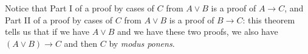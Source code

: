 \documentclass[12pt]{article}
\begin{document}
Notice that Part I of a proof by cases of $C$ from $A \vee B$ is a
proof of $A \rightarrow C$, and Part II of a proof by cases of $C$
from $A \vee B$ is a proof of $B \rightarrow C$: this theorem tells us
that if we have $A\vee B$ and we have these two proofs, we also have
$(A \vee B)\rightarrow C$ and then $C$ by {\em modus ponens\/}.

\newpage

\begin{comment}

\subsubsection{More Examples}

One direction of de Morgan's laws:

\begin{description}

\item [Theorem:]  $$\neg(A \wedge B) \leftrightarrow \neg A \vee \neg B$$

\begin{description}

\item[Part I:]  Goal:  $\neg(A \wedge B) \rightarrow \neg A \vee \neg B$

\begin{description}

\item[Assume (1):]  $\neg(A \wedge B)$

\item[Goal:]  $\neg A \vee \neg B$

Use the strategy for disjunction.

\begin{description}

\item[Assume (2):]  $\neg\neg A$

we will make the obvious application of double negation below.

\item[Goal:] $\neg B$

\begin{description}

\item[Assume (3):]  $B$

\item[Goal:]  $\perp$ (contradiction)

It is now a good idea to adopt $A \wedge B$ as a target, to take advantage
of assumption 1 to get a contradiction.


\end{comment}
\end{document}

